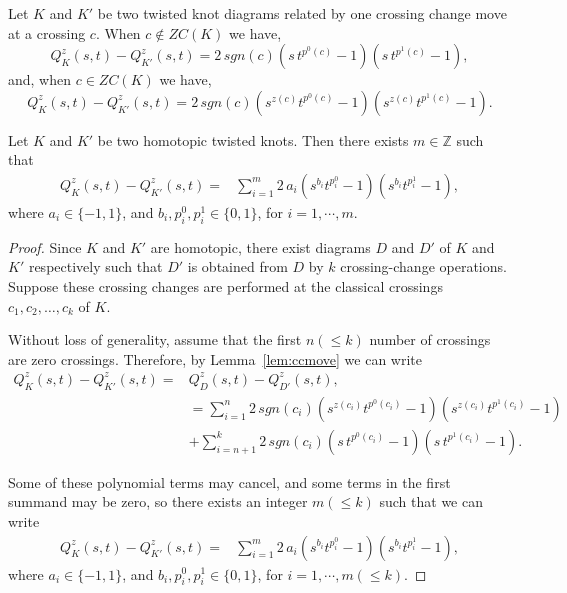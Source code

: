 \documentclass[10pt,a4paper]{amsart}
\begin{document}
\begin{lemma}\label{lem:ccmove}
	Let $K$ and $K'$ be two twisted knot diagrams related by one crossing change move at a crossing $c$. When $c \notin ZC(K)$ we have,
	\[Q^{z}_{K}(s,t)-Q^{z}_{K'}(s,t) = 2\,sgn(c)(s\,t^{p^{0}(c)}-1)(s\,t^{p^{1}(c)}-1),\]
	and, when $c \in ZC(K)$ we have,
	\[Q^{z}_{K}(s,t)-Q^{z}_{K'}(s,t) = 2\,sgn(c)(s^{z(c)}t^{p^{0}(c)}-1)(s^{z(c)}t^{p^{1}(c)}-1).\]
\end{lemma}

\begin{theorem}\label{thm:homotopic}
	Let $K$ and $K'$ be two homotopic twisted knots. Then there exists $m
	\in \mathbb{Z}$ such that
	\begin{equation*}
	\begin{aligned}
		Q^{z}_{K}(s,t)-Q^{z}_{K'}(s,t) = &\sum_{i=1}^{m} 2\,a_{i}(s^{b_{i}}t^{p^{0}_{i}}-1)(s^{b_{i}}t^{p^{1}_{i}}-1),
	\end{aligned}
\end{equation*}
where  $a_{i}\in \{-1,1\}$, and $b_{i}, p^{0}_{i}, p^{1}_{i} \in \{0,1\}$, for $i = 1,\cdots, m$.
\end{theorem}

  \begin{proof}
  Since $K$ and $K'$ are homotopic, there exist diagrams $D$ and $D'$ of $K$ and $K'$ respectively such that $D'$ is obtained from $D$ by $k$ crossing-change operations.
  	Suppose these crossing changes are performed at the classical crossings
  	$c_1,c_2,\ldots,c_k$ of $K$.

 Without loss of generality, assume that the first $n(\leq k)$ number of crossings are zero crossings. Therefore, by Lemma~\ref{lem:ccmove} we can write
  	\begin{equation}\label{eq:dist}
  		\begin{aligned}
  			Q^{z}_{K}(s,t)-Q^{z}_{K'}(s,t) =& Q^{z}_{D}(s,t)-Q^{z}_{D'}(s,t),\\
  			& =\sum_{i=1}^{n} 2\,sgn(c_{i})(s^{z(c_{i})}t^{p^{0}(c_{i})}-1)(s^{z(c_{i})}t^{p^{1}(c_{i})}-1) \\
  			&+ \sum_{i=n+1}^{k} 2\,sgn(c_{i})(s\,t^{p^{0}(c_{i})}-1)(s\,t^{p^{1}(c_{i})}-1).
  		\end{aligned}
  	\end{equation}
  
  Some of these polynomial terms may cancel, and some terms in the first summand may be zero, so there exists an integer $m(\leq k)$ such that we can write
  	\begin{equation*}
  		\begin{aligned}
  			Q^{z}_{K}(s,t)-Q^{z}_{K'}(s,t) = &\sum_{i=1}^{m} 2\,a_{i}(s^{b_{i}}t^{p^{0}_{i}}-1)(s^{b_{i}}t^{p^{1}_{i}}-1),
  		\end{aligned}
  	\end{equation*}
  		where  $a_{i}\in \{-1,1\}$, and $b_{i}, p^{0}_{i}, p^{1}_{i} \in \{0,1\}$, for $i = 1, \cdots, m (\leq k)$. 
  		 \end{proof}
\end{document}
